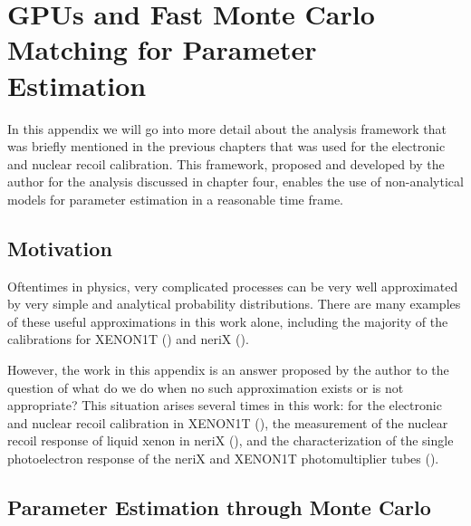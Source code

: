 

\pagestyle{cu}
\graphicspath{{./AppendixA/images/}}

\chapter[GPUs and Fast Monte Carlo Matching for Parameter Estimation][GPUs and Fast Monte Carlo Matching for Parameter Estimation]{GPUs and Fast Monte Carlo Matching for Parameter Estimation}
\label{app:gpus}

In this appendix we will go into more detail about the analysis framework that was briefly mentioned in the previous chapters that was used for the electronic and nuclear recoil calibration.  This framework, proposed and developed by the author for the analysis discussed in chapter four, enables the use of non-analytical models for parameter estimation in a reasonable time frame.  



\section{Motivation}

Oftentimes in physics, very complicated processes can be very well approximated by very simple and analytical probability distributions.  There are many examples of these useful approximations in this work alone, including the majority of the calibrations for XENON1T () and neriX ().

However, the work in this appendix is an answer proposed by the author to the question of what do we do when no such approximation exists or is not appropriate?  This situation arises several times in this work: for the electronic and nuclear recoil calibration in XENON1T (), the measurement of the nuclear recoil response of liquid xenon in neriX (), and the characterization of the single photoelectron response of the neriX and XENON1T photomultiplier tubes ().


\section{Parameter Estimation through Monte Carlo}

